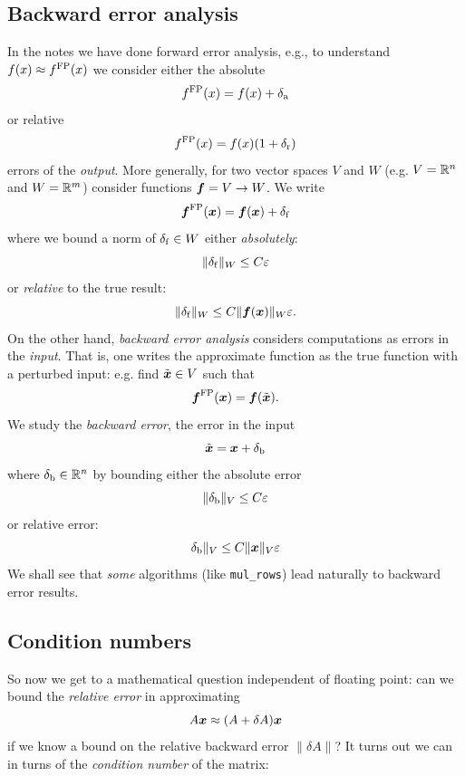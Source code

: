 \subsection{Backward error analysis}
In the notes we have done forward error analysis, e.g., to understand $f(x) \ensuremath{\approx} f^{\rm FP}(x)$ we consider either the absolute
\[
f^{\rm FP}(x) = f(x) + \ensuremath{\delta}_{\rm a}
\]
or relative
\[
f^{\rm FP}(x) = f(x)(1 + \ensuremath{\delta}_{\rm r})
\]
errors of the \emph{output}. More generally, for two vector spaces $V$ and $W$ (e.g. $V = {\mathbb R}^n$ and $W = {\mathbb R}^m$) consider functions $\bm{{\mbox{\boldmath$f$\unboldmath}}} = V \rightarrow W$. We write
\[
\bm{{\mbox{\boldmath$f$\unboldmath}}}^{\rm FP}(\bm{{\mbox{\boldmath$x$\unboldmath}}}) = \bm{{\mbox{\boldmath$f$\unboldmath}}}(\bm{{\mbox{\boldmath$x$\unboldmath}}}) + \delta_{\rm f}
\]
where we bound a norm of $\ensuremath{\delta}_{\rm f} \ensuremath{\in} W$ either \emph{absolutely}:
\[
\|\ensuremath{\delta}_{\rm f}\|_W \ensuremath{\leq} C \ensuremath{\varepsilon}
\]
or \emph{relative} to the true result:
\[
\|\delta_{\rm f}\|_W \leq C \| \bm{{\mbox{\boldmath$f$\unboldmath}}}(\bm{{\mbox{\boldmath$x$\unboldmath}}}) \|_W \varepsilon.
\]
On the other hand, \emph{backward error analysis}  considers computations as errors in the \emph{input}. That is, one writes the approximate function as the true function with a perturbed input: e.g. find $\tilde{{\mbox{\boldmath$x$\unboldmath}}} \in V$  such that
\[
\bm{{\mbox{\boldmath$f$\unboldmath}}}^{\rm FP}(\bm{{\mbox{\boldmath$x$\unboldmath}}}) = \bm{{\mbox{\boldmath$f$\unboldmath}}}(\tilde{{\mbox{\boldmath$x$\unboldmath}}}).
\]
We study the \emph{backward  error}, the error in the input
\[
\tilde{{\mbox{\boldmath$x$\unboldmath}}} = \bm{{\mbox{\boldmath$x$\unboldmath}}} + \delta_{\rm b}
\]
where $\delta_{\rm b} \in {\mathbb R}^n$ by bounding either the absolute error
\[
\|\ensuremath{\delta}_{\rm b}\|_V \ensuremath{\leq} C\ensuremath{\varepsilon}
\]
or relative error:
\[
\delta_{\rm b}\|_V \leq C \|\bm{{\mbox{\boldmath$x$\unboldmath}}}\|_V \varepsilon
\]
We shall see that \emph{some} algorithms (like \texttt{mul\_rows}) lead naturally to backward error results. 

\subsection{Condition numbers}
So now we get to a mathematical question independent of floating point:  can we bound the \emph{relative error} in approximating
\[
A \bm{{\mbox{\boldmath$x$\unboldmath}}} \approx (A + \delta A) \bm{{\mbox{\boldmath$x$\unboldmath}}}
\]
if we know a bound on the relative backward error   $\|\ensuremath{\delta}A\|$? It turns out we can in turns of the \emph{condition number} of the matrix:

